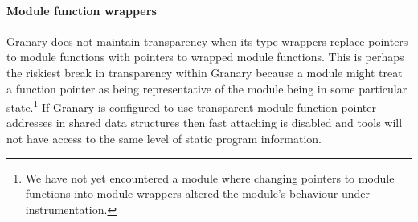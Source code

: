 \documentclass[preprint]{sigplanconf}
\begin{document}
\vspace{-3pt}\paragraph{Module function wrappers} Granary does not maintain transparency when its type wrappers replace pointers to module functions with pointers to wrapped module functions. This is perhaps the riskiest break in transparency within Granary because a module might treat a function pointer as being representative of the module being in some particular state.\footnote{We have not yet encountered a module where changing pointers to module functions into module wrappers altered the module's behaviour under instrumentation.} If Granary is configured to use transparent module function pointer addresses in shared data structures then fast attaching is disabled and tools will not have access to the same level of static program information.


%
\end{document}
